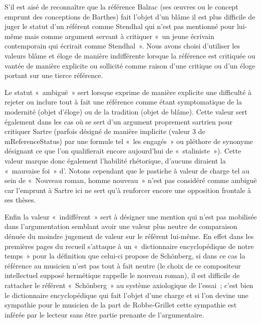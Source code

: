 \documentclass[12pt, a4paper]{article}
\begin{document}
S'il est aisé de reconnaître que la référence Balzac (ses œuvres ou le concept emprunt des conceptions de Barthes) fait l'objet d'un blâme il est plus difficile de juger le statut d'un référent comme Stendhal qui n'est pas mentionné pour lui-même mais comme argument servant à critiquer «~un jeune écrivain contemporain qui écrirait comme Stendhal~». Nous avons choisi d'utiliser les valeurs blâme et éloge de manière indifférente lorsque la référence est critiquée ou vantée de manière explicite ou sollicité comme raison d'une critique ou d'un éloge portant sur une tierce référence.

Le statut «~ambiguë~» sert lorsque \robbe{} exprime de manière explicite une difficulté à rejeter ou inclure tout à fait une référence comme étant symptomatique de la modernité (objet d'éloge) ou de la tradition (objet de blâme). Cette valeur sert également dans les cas où \robbe{} se sert d'un argument proprement sartrien pour critiquer Sartre (parfois désigné de manière implicite (valeur 3 de mReferenceStatus) par une formule tel «~les engagés~» ou pléthore de synonyme désignant ce que l'on qualifierait encore aujourd'hui de «~staliniste~»). Cette valeur marque donc également l'habilité rhétorique, d'aucuns diraient la «~mauvaise foi~» d'\robbe{}. Notons cependant que le pastiche à valeur de charge tel au sein de «~Nouveau roman, homme nouveau~» n'est pas considéré comme ambiguë car l'emprunt à Sartre ici ne sert qu'à renforcer encore une opposition frontale à ses thèses.

Enfin la valeur «~indifférent~» sert à désigner une mention qui n'est pas mobilisée dans l'argumentation semblant avoir une valeur plus neutre de comparaison dénuée du moindre jugement de valeur sur le référent lui-même. En effet dans les premières pages du recueil \robbe{} s'attaque à un «~dictionnaire encyclopédique de notre temps~» pour la définition que celui-ci propose de Schönberg, si dans ce cas la référence au musicien n'est pas tout à fait neutre (le choix de ce compositeur intellectuel supposé hermétique rappelle le nouveau roman), il est difficile de rattacher le référent «~Schönberg~» au système axiologique de l'essai~; c'est bien le dictionnaire encyclopédique qui fait l'objet d'une charge et si l'on devine une sympathie pour le musicien de la part de Robbe-Grillet cette sympathie est inférée par le lecteur sans être partie prenante de l'argumentaire.
   

\end{document}
